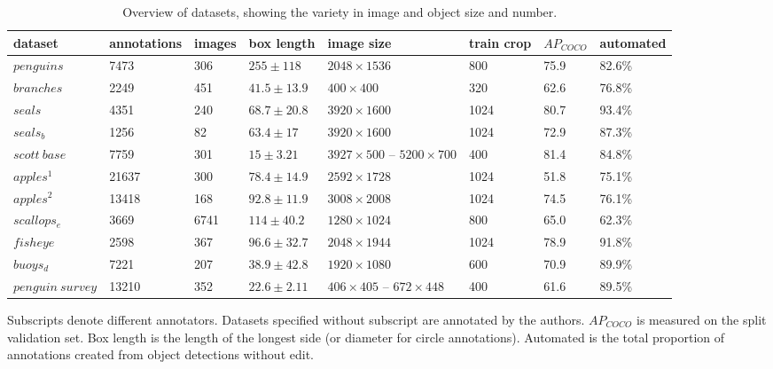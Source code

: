 \documentclass[conference]{IEEEtran}
\begin{document}
\begin{table}[thb]
\centering
\begin{threeparttable}
\centering
\caption{Overview of datasets, showing the variety in image and object size and number.  } 
\label{tab:resolutions} 
\begin{tabular}{l|lllllll}
dataset & annotations & images & box length & image size & train crop & $AP_{COCO}$ & automated \\
\toprule
$penguins$        & 7473        & 306    & $255 \pm 118$   &  $2048\times1536$  & 800                                   & 75.9  & 82.6\%                 \\
$branches$        & 2249        & 451    & $41.5 \pm 13.9$ &  $400\times400$    & 320                                   & 62.6  & 76.8\%                  \\
$seals$           & 4351        & 240    & $68.7 \pm 20.8$ &  $3920\times1600$  & 1024                                    & 80.7   & 93.4\%                 \\
$seals_b$         & 1256        & 82     & $63.4 \pm 17$   & $3920\times1600$  & 1024                                    & 72.9  & 87.3\%       \\
$scott\:base$     & 7759        & 301    & $15 \pm 3.21$     & $3927\times500$ -- $5200\times700$ & 400  & 81.4 & 84.8\%  \\
$apples^1$        & 21637       & 300    & $78.4 \pm 14.9$ &  $2592\times1728$ & 1024 & 51.8   & 75.1\%                  \\
$apples^2$        & 13418       & 168    & $92.8 \pm 11.9$ &  $3008\times2008$  & 1024                                    & 74.5  & 76.1\%                 \\
$scallops_e$      & 3669        & 6741   & $114 \pm 40.2$  &  $1280\times1024$  & 800                                   & 65.0    & 62.3\%               \\
$fisheye$         & 2598        & 367    & $96.6 \pm 32.7$ &  $2048\times1944$ & 1024                                     & 78.9   & 91.8\%                  \\
$buoys_d$         & 7221        & 207    & $38.9 \pm 42.8$ &  $1920\times1080$ & 600                                    & 70.9      & 89.9\%               \\
$penguin\:survey$ & 13210       & 352    & $22.6 \pm 2.11$ & $406\times405$ -- $672\times448$ & 400  & 61.6  & 89.5\%            \\ 
\bottomrule
\end{tabular}
\begin{tablenotes}
\small
\item Subscripts denote different annotators.  Datasets specified without subscript are annotated by the authors. $AP_{COCO}$ is measured on the split validation set. Box length is the length of the longest side (or diameter for circle annotations). Automated is the total proportion of annotations created from object detections without edit.

\end{tablenotes}
\end{threeparttable}
\end{table}
\end{document}
